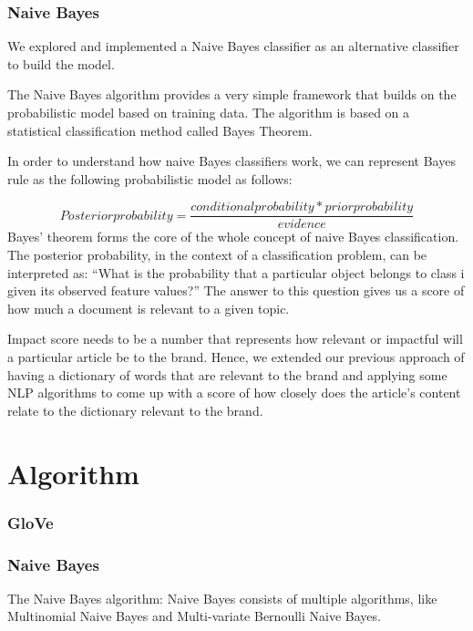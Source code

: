 \documentclass{article}
\begin{document}
\subsubsection{Naive Bayes}


We explored and implemented a Naive Bayes classifier as an alternative classifier to build the model.

The Naive Bayes algorithm provides a very simple framework that builds on the probabilistic model based on training data.
The algorithm is based on a statistical classification method called Bayes Theorem.

In order to understand how naive Bayes classifiers work, we can represent Bayes rule as the following probabilistic model as follows:

\[Posteriorprobability = \frac{conditionalprobability * priorprobability}{evidence}\]
Bayes’ theorem forms the core of the whole concept of naive Bayes classification. The posterior probability, in the context of a classification problem, can be interpreted as: “What is the probability that a particular object belongs to class i given its observed feature values?” The answer to this question gives us a score of how much a document is relevant to a given topic.


Impact score needs to be a number that represents how relevant or impactful will a particular article be to the brand. Hence, we extended our previous approach of having a dictionary of words that are relevant to the brand and applying some NLP algorithms to come up with a score of how closely does the article's content relate to the dictionary relevant to the brand.

\maketitle
\section {Algorithm}

\subsubsection {GloVe}

\subsubsection {Naive Bayes}
The Naive Bayes algorithm:
Naive Bayes consists of multiple algorithms, like Multinomial Naive Bayes and Multi-variate Bernoulli Naive Bayes.
\end{document}
